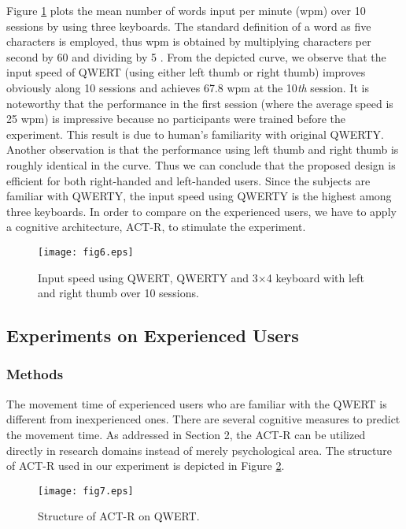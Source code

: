 \documentclass{singlecol-new}
\theoremstyle{TH}{
\newtheorem{lemma}{Lemma}
\newtheorem{theorem}[lemma]{Theorem}
\newtheorem{corrolary}[lemma]{Corrolary}
\newtheorem{conjecture}[lemma]{Conjecture}
\newtheorem{proposition}[lemma]{Proposition}
\newtheorem{claim}[lemma]{Claim}
\newtheorem{stheorem}[lemma]{Wrong Theorem}
\newtheorem{algorithm}{Algorithm}
}
\theoremstyle{THrm}{
\newtheorem{definition}{Definition}[section]
\newtheorem{question}{Question}[section]
\newtheorem{remark}{Remark}
\newtheorem{scheme}{Scheme}
}
\theoremstyle{THhit}{
\newtheorem{case}{Case}[section]
}
\begin{document}
Figure \ref{fig.perf} plots the mean number of words input per minute (wpm) over 10 sessions by using three keyboards. The standard definition of a word as five characters is employed, thus wpm is obtained by multiplying characters per second by 60 and dividing by 5 \citep{mackenzie2002text}. From the depicted curve, we observe that the input speed of QWERT (using either left thumb or right thumb) improves obviously along 10 sessions and achieves 67.8 wpm at the 10\textit{th} session. It is noteworthy that the performance in the first session (where the average speed is 25 wpm) is impressive because no participants were trained before the experiment. This result is due to human's familiarity with original QWERTY. Another observation is that the performance using left thumb and right thumb is roughly identical in the curve. Thus we can conclude that the proposed design is efficient for both right-handed and left-handed users. Since the subjects are familiar with QWERTY, the input speed using QWERTY is the highest among three keyboards. In order to compare on the experienced users, we have to apply a cognitive architecture, ACT-R,  to stimulate the experiment. \\

\begin{figure}
  \centering
  \caption{Input speed using QWERT, QWERTY and 3$\times$4 keyboard with left and right thumb over 10 sessions.}\label{fig.perf}
  \texttt{[image: fig6.eps]}
\end{figure}

\subsection{Experiments on Experienced Users}

\subsubsection{Methods}

The movement time of experienced users who are familiar with the QWERT is different from inexperienced ones. There are several cognitive measures to predict the movement time. As addressed in Section 2, the ACT-R can be utilized directly in research domains instead of merely psychological area. The structure of ACT-R used in our experiment is depicted in Figure \ref{fig.str}. \\

\begin{figure}
  \centering
  \caption{Structure of ACT-R on QWERT.}\label{fig.str}
  \texttt{[image: fig7.eps]}
\end{figure}
\end{document}
